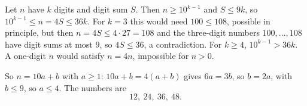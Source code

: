 Let $n$ have $k$ digits and digit sum $S$. Then $n\ge10^{k-1}$ and $S\le9k$, so $10^{k-1}\le n=4S\le36k$. For $k=3$ this would need $100\le108$, possible in principle, but then $n=4S\le4\cdot27=108$ and the three-digit numbers $100,\dots,108$ have digit sums at most $9$, so $4S\le36$, a contradiction. For $k\ge4$, $10^{k-1}>36k$. A one-digit $n$ would satisfy $n=4n$, impossible for $n>0$.

So $n=10a+b$ with $a\ge1$: $10a+b=4(a+b)$ gives $6a=3b$, so $b=2a$, with $b\le9$, so $a\le4$. The numbers are
\[
\boxed{12,\ 24,\ 36,\ 48}.
\]
